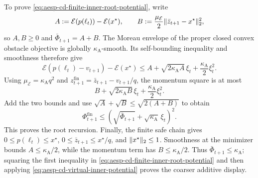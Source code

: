 To prove \cref{eq:aesp-cd-finite-inner-root-potential}, write
\begin{equation*}
 A:=\mathcal E(p(\ell_t))-\mathcal E(x^\star),\qquad
 B:=\frac{\mu_{\mathcal E}}2
       \lVert\bar z_{t+1}-x^\star\rVert_2^2,
\end{equation*}
so $A,B\geq0$ and $\bar\Phi_{t+1}=A+B$.  The Moreau envelope of the proper
closed convex obstacle objective is globally $\kappa_{\mathrm A}$-smooth.
Its self-bounding inequality and smoothness therefore give
\begin{equation*}
 \mathcal E(p(\ell_t)-v_{t+1})-\mathcal E(x^\star)
 \leq A+\sqrt{2\kappa_{\mathrm A}A}\,\xi_t
       +\frac{\kappa_{\mathrm A}}2\xi_t^2.
\end{equation*}
Using $\mu_{\mathcal E}=\kappa_{\mathrm A}q^2$ and
$z_{t+1}^{\mathrm{fin}}=\bar z_{t+1}-v_{t+1}/q$, the momentum square is at
most
\begin{equation*}
 B+\sqrt{2\kappa_{\mathrm A}B}\,\xi_t
  +\frac{\kappa_{\mathrm A}}2\xi_t^2.
\end{equation*}
Add the two bounds and use
$\sqrt A+\sqrt B\leq\sqrt{2(A+B)}$ to obtain
\begin{equation*}
 \Phi_{t+1}^{\mathrm{fin}}
 \leq\left(\sqrt{\bar\Phi_{t+1}}
              +\sqrt{\kappa_{\mathrm A}}\,\xi_t\right)^2.
\end{equation*}
This proves the root recursion.  Finally, the finite safe chain gives
$0\leq p(\ell_t)\leq x^\star$, $0\leq\bar z_{t+1}\leq x^\star/q$, and
$\lVert x^\star\rVert_2\leq1$.  Smoothness at the minimizer bounds $A\leq
\kappa_{\mathrm A}/2$, while the momentum term has $B\leq
\kappa_{\mathrm A}/2$.  Thus $\bar\Phi_{t+1}\leq\kappa_{\mathrm A}$;
squaring the first inequality in
\cref{eq:aesp-cd-finite-inner-root-potential} and then applying
\cref{eq:aesp-cd-virtual-inner-potential} proves the coarser additive display.
